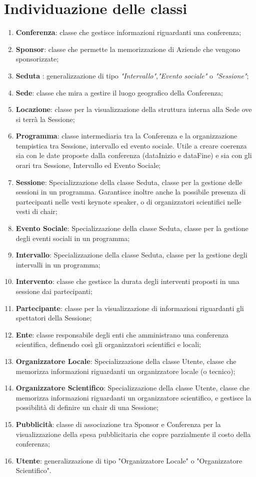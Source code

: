 \documentclass[a4paper,italian,10pt,openany]{book}
\begin{document}
	\section{Individuazione delle classi}
	\begin{enumerate}
	\item \textbf{Conferenza}: classe che gestisce informazioni riguardanti una conferenza;
	\item \textbf{Sponsor}: classe che permette la memorizzazione di Aziende che vengono sponsorizzate;
	\item \textbf{Seduta} : generalizzazione di tipo \textit{"Intervallo"},\textit{"Evento sociale"} o \textit{"Sessione"};
	\item \textbf{Sede}: classe che mira a gestire il luogo geografico della Conferenza;
	\item \textbf{Locazione}: classe per la visualizzazione della struttura interna alla Sede ove si terrà la Sessione;
	\item \textbf{Programma}: classe intermediaria tra la Conferenza e la organizzazione tempistica tra Sessione, intervallo ed evento sociale. Utile a creare coerenza sia con le date proposte dalla conferenza (dataInizio e dataFine) e sia con gli orari tra Sessione, Intervallo ed Evento Sociale;
	\item \textbf{Sessione}: Specializzazione della classe Seduta, classe per la gestione delle sessioni in un programma. Garantisce inoltre anche la possibile presenza di partecipanti nelle vesti keynote speaker, o di organizzatori scientifici nelle vesti di chair;
	\item \textbf{Evento Sociale}: Specializzazione della classe Seduta, classe per la gestione degli eventi sociali in un programma;
	\item \textbf{Intervallo}: Specializzazione della classe Seduta, classe per la gestione degli intervalli in un programma;
	\item \textbf{Intervento}: classe che gestisce la durata degli interventi proposti in una sessione dai partecipanti;
	\item \textbf{Partecipante}: classe per la visualizzazione di informazioni riguardanti gli spettatori della Sessione;
	\item \textbf{Ente}: classe responsabile degli enti che amministrano una conferenza scientifica, definendo così gli organizzatori scientifici e locali;
	\item \textbf{Organizzatore Locale}: Specializzazione della classe Utente, classe che memorizza informazioni riguardanti un organizzatore locale (o tecnico);
	\item \textbf{Organizzatore Scientifico}: Specializzazione della classe Utente, classe che memorizza informazioni riguardanti un organizzatore scientifico, e gestisce la possibilità di definire un chair di una Sessione;
	\item \textbf{Pubblicità}: classe di associazione tra Sponsor e Conferenza per la visualizzazione della spesa pubblicitaria che copre parzialmente il costo della conferenza;
	\item \textbf{Utente}: generalizzazione di tipo "Organizzatore Locale" o "Organizzatore Scientifico".
	\end{enumerate}
\end{document}
